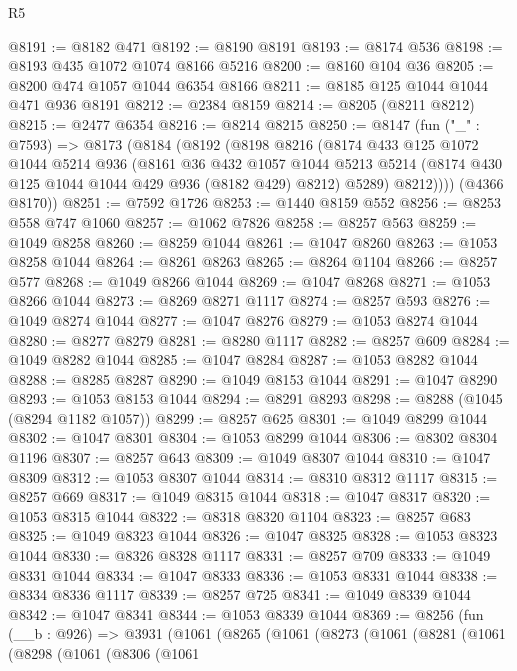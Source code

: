 \begin{lexlean}{R5}
\begin{coremodule}
@8191 := @8182 @471
@8192 := @8190 @8191
@8193 := @8174 @536
@8198 := @8193 @435 @1072 @1074 @8166 @5216
@8200 := @8160 @104 @36
@8205 := @8200 @474 @1057 @1044 @6354 @8166
@8211 := @8185 @125 @1044 @1044 @471 @936 @8191
@8212 := @2384 @8159
@8214 := @8205 (@8211 @8212)
@8215 := @2477 @6354
@8216 := @8214 @8215
@8250 := @8147
    (fun ("_" : @7593) =>
    @8173
      (@8184
        (@8192
          (@8198
            @8216
            (@8174
              @433
              @125
              @1072
              @1044
              @5214
              @936
              (@8161
                @36
                @432
                @1057
                @1044
                @5213
                @5214
                (@8174 @430 @125 @1044 @1044 @429 @936 (@8182 @429) @8212)
                @5289)
              @8212))))
      (@4366 @8170))
@8251 := @7592 @1726
@8253 := @1440 @8159 @552
@8256 := @8253 @558 @747 @1060
@8257 := @1062 @7826
@8258 := @8257 @563
@8259 := @1049 @8258
@8260 := @8259 @1044
@8261 := @1047 @8260
@8263 := @1053 @8258 @1044
@8264 := @8261 @8263
@8265 := @8264 @1104
@8266 := @8257 @577
@8268 := @1049 @8266 @1044
@8269 := @1047 @8268
@8271 := @1053 @8266 @1044
@8273 := @8269 @8271 @1117
@8274 := @8257 @593
@8276 := @1049 @8274 @1044
@8277 := @1047 @8276
@8279 := @1053 @8274 @1044
@8280 := @8277 @8279
@8281 := @8280 @1117
@8282 := @8257 @609
@8284 := @1049 @8282 @1044
@8285 := @1047 @8284
@8287 := @1053 @8282 @1044
@8288 := @8285 @8287
@8290 := @1049 @8153 @1044
@8291 := @1047 @8290
@8293 := @1053 @8153 @1044
@8294 := @8291 @8293
@8298 := @8288 (@1045 (@8294 @1182 @1057))
@8299 := @8257 @625
@8301 := @1049 @8299 @1044
@8302 := @1047 @8301
@8304 := @1053 @8299 @1044
@8306 := @8302 @8304 @1196
@8307 := @8257 @643
@8309 := @1049 @8307 @1044
@8310 := @1047 @8309
@8312 := @1053 @8307 @1044
@8314 := @8310 @8312 @1117
@8315 := @8257 @669
@8317 := @1049 @8315 @1044
@8318 := @1047 @8317
@8320 := @1053 @8315 @1044
@8322 := @8318 @8320 @1104
@8323 := @8257 @683
@8325 := @1049 @8323 @1044
@8326 := @1047 @8325
@8328 := @1053 @8323 @1044
@8330 := @8326 @8328 @1117
@8331 := @8257 @709
@8333 := @1049 @8331 @1044
@8334 := @1047 @8333
@8336 := @1053 @8331 @1044
@8338 := @8334 @8336 @1117
@8339 := @8257 @725
@8341 := @1049 @8339 @1044
@8342 := @1047 @8341
@8344 := @1053 @8339 @1044
@8369 := @8256
    (fun (__b : @926) =>
    @3931
      (@1061
        (@8265
          (@1061
            (@8273
              (@1061
                (@8281
                  (@1061
                    (@8298
                      (@1061
                        (@8306
                          (@1061

\end{coremodule}
\end{lexlean}
